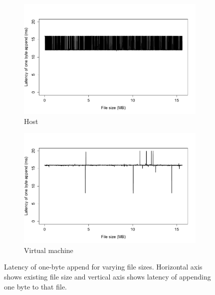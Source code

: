 \begin{figure}[ht!]
    \begin{subfigure}[b]{0.5\textwidth}
		\includegraphics[width=1\textwidth]{./figures/p4_host.pdf}
		\caption{Host}
		\label{fig:p4host}
    \end{subfigure}
    \begin{subfigure}[b]{0.5\textwidth}
		\includegraphics[width=1\textwidth]{./figures/p4_vm.pdf}
		\caption{Virtual machine}
		\label{fig:p4vm}
    \end{subfigure}
	\caption{Latency of one-byte append for varying file sizes. Horizontal axis shows existing file size and vertical axis shows latency of appending one byte to that file.}
	\label{fig:p4}
\end{figure}
